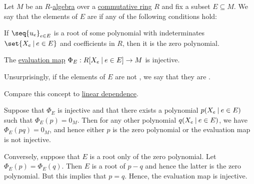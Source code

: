 \begin{definition}\label{def:algebraic_dependence}\mimprovised
  Let \( M \) be an \( R \)-\hyperref[def:algebra_over_ring]{algebra} over a \hyperref[def:ring/commutative]{commutative ring} \( R \) and fix a subset \( E \subseteq M \). We say that the elements of \( E \) are  if any of the following conditions hold:

  \begin{thmenum}
     If \( \seq{ u_e }_{e \in E} \) is a root of some polynomial with indeterminates \( \set{ X_e \given e \in E } \) and coefficients in \( R \), then it is the zero polynomial.

     The \hyperref[thm:polynomial_algebra_universal_property]{evaluation map} \( \Phi_E: R[X_e \given e \in E] \to M \) is injective.
  \end{thmenum}

  Unsurprisingly, if the elements of \( E \) are not , we say that they are .

  Compare this concept to \hyperref[def:linear_dependence]{linear dependence}.
\end{definition}
\begin{defproof}
   Suppose that \( \Phi_E \) is injective and that there exists a polynomial \( p(X_e \given e \in E) \) such that \( \Phi_E(p) = 0_M \). Then for any other polynomial \( q(X_e \given e \in E) \), we have \( \Phi_E(p q) = 0_M \), and hence either \( p \) is the zero polynomial or the evaluation map is not injective.

   Conversely, suppose that \( E \) is a root only of the zero polynomial. Let \( \Phi_E(p) = \Phi_E(q) \). Then \( E \) is a root of \( p - q \) and hence the latter is the zero polynomial. But this implies that \( p = q \). Hence, the evaluation map is injective.
\end{defproof}


